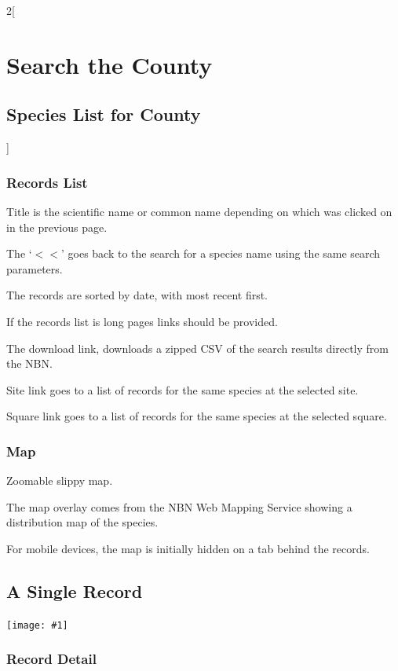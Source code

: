 \documentclass[a4paper,12pt,landscape]{article}
\newcommand{\wireframe}[1]{\texttt{[image: \#1]}\clearpage}
\begin{document}
\begin{multicols*}{2}[%
  \section{Search the County}%
  \subsection{Species List for County}%
  \label{sec:species-list-for-county}%
]
\subsubsection*{Records List} 

\begin{todolist}
  \item Title is the scientific name or common name depending on which was clicked on in the previous page.
  \item The `$<<$' goes back to the search for a species name using the same search parameters.
  \item The records are sorted by date, with most recent first.
  \item If the records list is long pages links should be provided.
  \item The download link, downloads a zipped CSV of the search results directly from the NBN.
  \item Site link goes to a list of records for the same species at the selected site.
  \item Square link goes to a list of records for the same species at the selected square.
\end{todolist}

\subsubsection*{Map} 

\begin{todolist}
  \item Zoomable slippy map.
  \item The map overlay comes from the NBN Web Mapping Service showing a distribution map of the species.
  \item For mobile devices, the map is initially hidden on a tab behind the records.
\end{todolist}

\clearpage
\subsection{A Single Record}

\wireframe{./wireframes/Records__SingleRecord.png}%

\subsubsection*{Record Detail} 


\end{multicols*}
\end{document}
